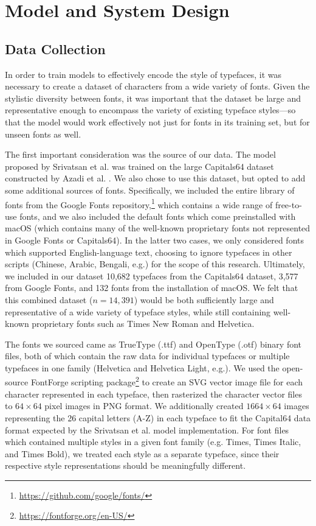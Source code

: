 \chapter{Model and System Design}
\label{chap:methodology}

\section{Data Collection} \label{data-collection}

In order to train models to effectively encode the style of typefaces, it was necessary to create a dataset of characters from a wide variety of fonts. Given the stylistic diversity between fonts, it was important that the dataset be large and representative enough to encompass the variety of existing typeface styles---so that the model would work effectively not just for fonts in its training set, but for unseen fonts as well.

The first important consideration was the source of our data. The model proposed by Srivatsan et al. \cite{srivatsan2020} was trained on the large Capitals64 dataset constructed by Azadi et al. \cite{azadi2017}. We also chose to use this dataset, but opted to add some additional sources of fonts. Specifically, we included the entire library of fonts from the Google Fonts repository,\footnote{\url{https://github.com/google/fonts/}} which contains a wide range of free-to-use fonts, and we also included the default fonts which come preinstalled with macOS (which contains many of the well-known proprietary fonts not represented in Google Fonts or Capitals64). In the latter two cases, we only considered fonts which supported English-language text, choosing to ignore typefaces in other scripts (Chinese, Arabic, Bengali, e.g.) for the scope of this research. Ultimately, we included in our dataset 10,682 typefaces from the Capitals64 dataset, 3,577 from Google Fonts, and 132 fonts from the installation of macOS. We felt that this combined dataset ($n = 14,391$) would be both sufficiently large and representative of a wide variety of typeface styles, while still containing well-known proprietary fonts such as Times New Roman and Helvetica.

The fonts we sourced came as TrueType (.ttf) and OpenType (.otf) binary font files, both of which contain the raw data for individual typefaces or multiple typefaces in one family (Helvetica and Helvetica Light, e.g.). We used the open-source FontForge scripting package\footnote{\url{https://fontforge.org/en-US/}} to create an SVG vector image file for each character represented in each typeface, then rasterized the character vector files to $64 \times 64$ pixel images in PNG format. We additionally created $1664 \times 64$ images representing the 26 capital letters (A-Z) in each typeface to fit the Capital64 data format expected by the Srivatsan et al. model implementation. For font files which contained multiple styles in a given font family (e.g. Times, Times Italic, and Times Bold), we treated each style as a separate typeface, since their respective style representations should be meaningfully different.

